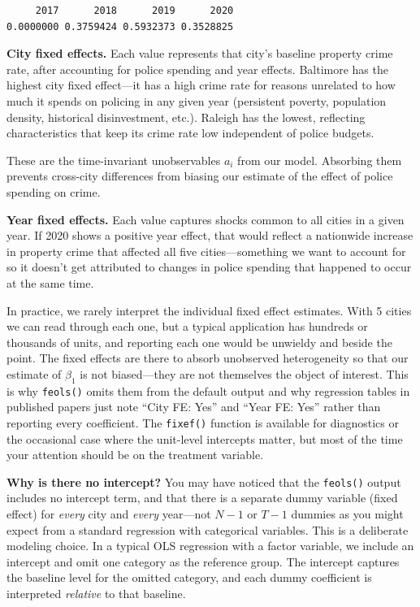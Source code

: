 \documentclass[
  letterpaper,
  DIV=11,
  numbers=noendperiod]{scrreprt}
\begin{document}
\begin{verbatim}
     2017      2018      2019      2020 
0.0000000 0.3759424 0.5932373 0.3528825 
\end{verbatim}

\textbf{City fixed effects.} Each value represents that city's baseline
property crime rate, after accounting for police spending and year
effects. Baltimore has the highest city fixed effect---it has a high
crime rate for reasons unrelated to how much it spends on policing in
any given year (persistent poverty, population density, historical
disinvestment, etc.). Raleigh has the lowest, reflecting characteristics
that keep its crime rate low independent of police budgets.

These are the time-invariant unobservables \(a_i\) from our model.
Absorbing them prevents cross-city differences from biasing our estimate
of the effect of police spending on crime.

\textbf{Year fixed effects.} Each value captures shocks common to all
cities in a given year. If 2020 shows a positive year effect, that would
reflect a nationwide increase in property crime that affected all five
cities---something we want to account for so it doesn't get attributed
to changes in police spending that happened to occur at the same time.

In practice, we rarely interpret the individual fixed effect estimates.
With 5 cities we can read through each one, but a typical application
has hundreds or thousands of units, and reporting each one would be
unwieldy and beside the point. The fixed effects are there to absorb
unobserved heterogeneity so that our estimate of \(\beta_1\) is not
biased---they are not themselves the object of interest. This is why
\texttt{feols()} omits them from the default output and why regression
tables in published papers just note ``City FE: Yes'' and ``Year FE:
Yes'' rather than reporting every coefficient. The \texttt{fixef()}
function is available for diagnostics or the occasional case where the
unit-level intercepts matter, but most of the time your attention should
be on the treatment variable.

\textbf{Why is there no intercept?} You may have noticed that the
\texttt{feols()} output includes no intercept term, and that there is a
separate dummy variable (fixed effect) for \emph{every} city and
\emph{every} year---not \(N - 1\) or \(T - 1\) dummies as you might
expect from a standard regression with categorical variables. This is a
deliberate modeling choice. In a typical OLS regression with a factor
variable, we include an intercept and omit one category as the reference
group. The intercept captures the baseline level for the omitted
category, and each dummy coefficient is interpreted \emph{relative} to
that baseline.
\end{document}
